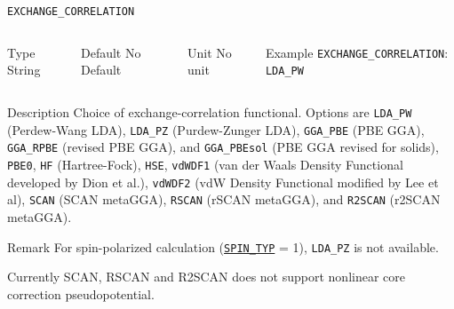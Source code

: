 \begin{frame}[allowframebreaks]{\texttt{EXCHANGE\_CORRELATION}} \label{EXCHANGE_CORRELATION}
\vspace*{-12pt}
\begin{columns}
\begin{block}{Type}
String
\end{block}

\begin{block}{Default}
No Default
\end{block}

\begin{block}{Unit}
No unit
\end{block}

\begin{block}{Example}
\texttt{EXCHANGE\_CORRELATION}: \texttt{LDA\_PW}
\end{block}
\end{columns}

\begin{block}{Description}
Choice of exchange-correlation functional. Options are \texttt{LDA\_PW} (Perdew-Wang LDA), \texttt{LDA\_PZ} (Purdew-Zunger LDA), 
\texttt{GGA\_PBE} (PBE GGA), \texttt{GGA\_RPBE} (revised PBE GGA), and \texttt{GGA\_PBEsol} (PBE GGA revised for solids), 
\texttt{PBE0}, \texttt{HF} (Hartree-Fock), \texttt{HSE},
\texttt{vdWDF1} (van der Waals Density Functional developed by Dion et al.), \texttt{vdWDF2} (vdW Density Functional modified by Lee et al), \texttt{SCAN} (SCAN metaGGA), \texttt{RSCAN} (rSCAN metaGGA), and \texttt{R2SCAN} (r2SCAN metaGGA).
\end{block}

\begin{block}{Remark}
For spin-polarized calculation (\hyperlink{SPIN_TYP}{\texttt{SPIN\_TYP}} = 1), \texttt{LDA\_PZ} is not available.

Currently SCAN, RSCAN and R2SCAN does not support nonlinear core correction pseudopotential.
\end{block}

\end{frame}




